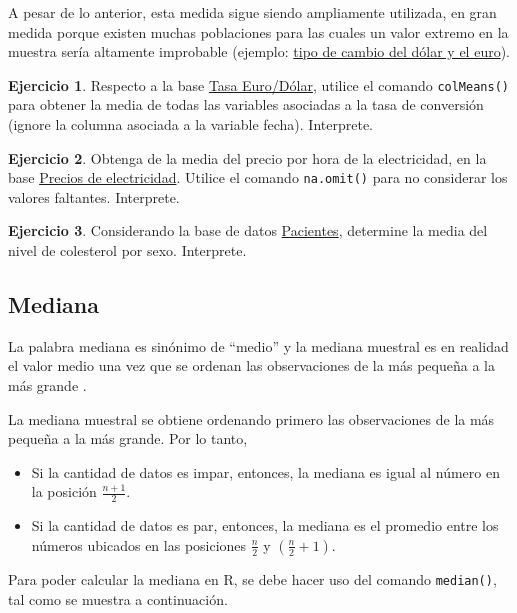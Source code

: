 \documentclass[
  11pt,
]{book}
\providecommand{\tightlist}{%
  \setlength{\itemsep}{0pt}\setlength{\parskip}{0pt}}
\theoremstyle{definition}
\theoremstyle{definition}
\theoremstyle{definition}
\newtheorem{exercise}{Ejercicio}[chapter]
\theoremstyle{definition}
\theoremstyle{remark}
\begin{document}
A pesar de lo anterior, esta medida sigue siendo ampliamente utilizada, en gran medida porque existen muchas poblaciones para las cuales un valor extremo en la muestra sería altamente improbable (ejemplo: \href{https://www.google.com/finance/quote/EUR-CLP?window=MAX&comparison=USD-CLP}{tipo de cambio del dólar y el euro}).

\begin{exercise}
Respecto a la base \hyperref[TasaEURUSD]{Tasa Euro/Dólar}, utilice el comando \texttt{colMeans()} para obtener la media de todas las variables asociadas a la tasa de conversión (ignore la columna asociada a la variable fecha). Interprete.
\end{exercise}

\begin{exercise}
Obtenga de la media del precio por hora de la electricidad, en la base \hyperref[PreciosElectricidad]{Precios de electricidad}. Utilice el comando \texttt{na.omit()} para no considerar los valores faltantes. Interprete.
\end{exercise}

\begin{exercise}
Considerando la base de datos \hyperref[Pacientes]{Pacientes}, determine la media del nivel de colesterol por sexo. Interprete.
\end{exercise}

\subsection{Mediana}\label{topicos-medidas-localizacion-mediana}

La palabra mediana es sinónimo de ``medio'' y la mediana muestral es en realidad el valor medio una vez que se ordenan las observaciones de la más pequeña a la más grande \citep[página 26]{Devore}.

La mediana muestral se obtiene ordenando primero las observaciones de la más pequeña a la más grande. Por lo tanto,

\begin{itemize}
\tightlist
\item
  Si la cantidad de datos es impar, entonces, la mediana es igual al número en la posición \(\frac{n+1}{2}\).
\item
  Si la cantidad de datos es par, entonces, la mediana es el promedio entre los números ubicados en las posiciones \(\frac{n}{2}\) y \((\frac{n}{2}+1)\).
\end{itemize}

Para poder calcular la mediana en R, se debe hacer uso del comando \texttt{median()}, tal como se muestra a continuación.
\end{document}
